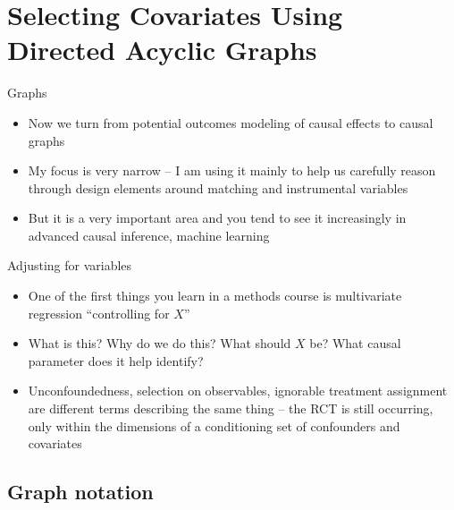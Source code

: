 \documentclass{beamer}
\begin{document}




\section{Selecting Covariates Using Directed Acyclic Graphs}

\begin{frame}{Graphs}

\begin{itemize}

\item Now we turn from potential outcomes modeling of causal effects to causal graphs
\item My focus is very narrow -- I am using it mainly to help us carefully reason through design elements around matching and instrumental variables
\item But it is a very important area and you tend to see it increasingly in advanced causal inference, machine learning

\end{itemize}

\end{frame}

\begin{frame}{Adjusting for variables}

\begin{itemize}
\item One of the first things you learn in a methods course is multivariate regression ``controlling for $X$''
\item What is this? Why do we do this?  What should $X$ be? What causal parameter does it help identify?
\item Unconfoundedness, selection on observables, ignorable treatment assignment are different terms describing the same thing -- the RCT is still occurring, only within the dimensions of a conditioning set of confounders and covariates
\end{itemize}

\end{frame}


\subsection{Graph notation}
\end{document}
